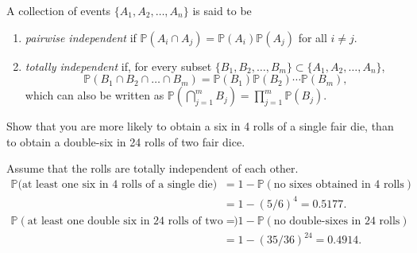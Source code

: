 \documentclass[lecture]{csm}
\newcommand{\prob}{\mathbb{P}}
\def\it{\item}
\def\ben{\begin{enumerate}}
\def\een{\end{enumerate}}
\begin{document}
\newpage
\begin{definition}
A collection of events $\{A_1,A_2,\ldots,A_n\}$ is said to be 
\ben
\it \emph{pairwise independent} if $\prob(A_i\cap A_j)=\prob(A_i)\prob(A_j)$ for all $i\neq j$.
\it \emph{totally independent} if, for every subset 
$\{B_1,B_2,\ldots,B_m\}\subset \{A_1,A_2,\ldots,A_n\}$, 
\[
\prob(B_1\cap B_2\cap \ldots \cap B_m) = \prob(B_1)\prob(B_2)\cdots\prob(B_m),
\]
which can also be written as $\prob\left(\bigcap_{j=1}^m B_j\right) = \prod_{j=1}^m \prob(B_j)$.
\een
\end{definition}
%

\begin{example}[de M\'{e}r\'{e}'s Paradox]
Show that you are more likely to obtain a six in 4 rolls of a single fair die, than to obtain a double-six in 24 rolls of two fair dice.
\end{example}
\begin{solution}
Assume that the rolls are totally independent of each other.
\[\begin{array}{ll}
\prob(\text{at least one six in 4 rolls of a single die)}
	& = 1- \prob(\text{no sixes obtained in 4 rolls}) \\
	& = 1 - (5/6)^4 = 0.5177. \\
\prob(\text{at least one double six in 24 rolls of two dice}) 
	& = 1- \prob(\text{no double-sixes in 24 rolls}) \\
	& = 1 - (35/36)^{24}  = 0.4914. 
\end{array}\]
\end{solution}


\newpage %
\end{document}
